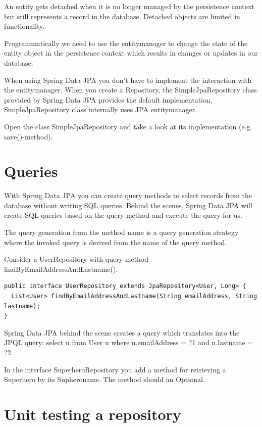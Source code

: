 An entity gets detached when it is no longer managed by the persistence context but still represents a record in the database.
Detached objects are limited in functionality.

 
Programmatically we need to use the entitymanager to change the state of the entity object in the persistence context which results in changes or updates in our database. 

When using Spring Data JPA you don't have to implement the interaction with the entitymanager. When you create a Repository, the SimpleJpaRepository class provided by Spring Data JPA provides the default implementation. SimpleJpaRepository class internally uses JPA entitymanager.

\begin{oefening}
Open the class SimpleJpaRepository and take a look at its implementation (e.g. save()-method).
\end{oefening}


\section{Queries}

With Spring Data JPA you can create query methods to select records from the database without writing SQL queries. Behind the scenes, Spring Data JPA will create SQL queries based on the query method and execute the query for us.

The query generation from the method name is a query generation strategy where the invoked query is derived from the name of the query method.

Consider a UserRepository with query method findByEmailAddressAndLastname().

\begin{lstlisting}
public interface UserRepository extends JpaRepository<User, Long> {
  List<User> findByEmailAddressAndLastname(String emailAddress, String lastname);
}
\end{lstlisting}

Spring Data JPA behind the scene creates a query which translates into the JPQL query: select u from User u where u.emailAddress = ?1 and u.lastname = ?2. 

\begin{oefening}
In the interface SuperheroRepository you add a method for retrieving a Superhero by its Supheroname. The method should an Optional.
\end{oefening}


\section{Unit testing a repository}


